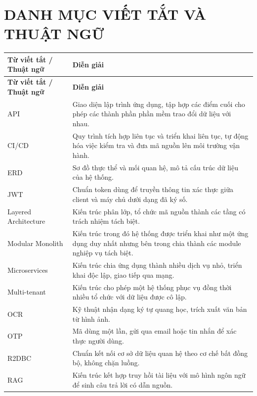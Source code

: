 \documentclass[12pt,a4paper,oneside]{report}
\begin{document}
\newpage
\listoftables
{}

\newpage
\chapter*{DANH MỤC VIẾT TẮT VÀ THUẬT NGỮ}

\renewcommand{\arraystretch}{1.3}
\begin{longtable}{|>{\raggedright\arraybackslash}p{3.2cm}|>{\raggedright\arraybackslash}p{11.3cm}|}
\hline
\textbf{Từ viết tắt / Thuật ngữ} & \textbf{Diễn giải} \\ \hline
\endfirsthead
\hline
\textbf{Từ viết tắt / Thuật ngữ} & \textbf{Diễn giải} \\ \hline
\endhead
API & Giao diện lập trình ứng dụng, tập hợp các điểm cuối cho phép các thành phần phần mềm trao đổi dữ liệu với nhau. \\ \hline
CI/CD & Quy trình tích hợp liên tục và triển khai liên tục, tự động hóa việc kiểm tra và đưa mã nguồn lên môi trường vận hành. \\ \hline
ERD & Sơ đồ thực thể và mối quan hệ, mô tả cấu trúc dữ liệu của hệ thống. \\ \hline
JWT & Chuẩn token dùng để truyền thông tin xác thực giữa client và máy chủ dưới dạng đã ký số. \\ \hline
Layered Architecture & Kiến trúc phân lớp, tổ chức mã nguồn thành các tầng có trách nhiệm tách biệt. \\ \hline
Modular Monolith & Kiến trúc trong đó hệ thống được triển khai như một ứng dụng duy nhất nhưng bên trong chia thành các module nghiệp vụ tách biệt. \\ \hline
Microservices & Kiến trúc chia ứng dụng thành nhiều dịch vụ nhỏ, triển khai độc lập, giao tiếp qua mạng. \\ \hline
Multi-tenant & Kiến trúc cho phép một hệ thống phục vụ đồng thời nhiều tổ chức với dữ liệu được cô lập. \\ \hline
OCR & Kỹ thuật nhận dạng ký tự quang học, trích xuất văn bản từ hình ảnh. \\ \hline
OTP & Mã dùng một lần, gửi qua email hoặc tin nhắn để xác thực người dùng. \\ \hline
R2DBC & Chuẩn kết nối cơ sở dữ liệu quan hệ theo cơ chế bất đồng bộ, không chặn luồng. \\ \hline
RAG & Kiến trúc kết hợp truy hồi tài liệu với mô hình ngôn ngữ để sinh câu trả lời có dẫn nguồn. \\ \hline

\end{longtable}
\end{document}
